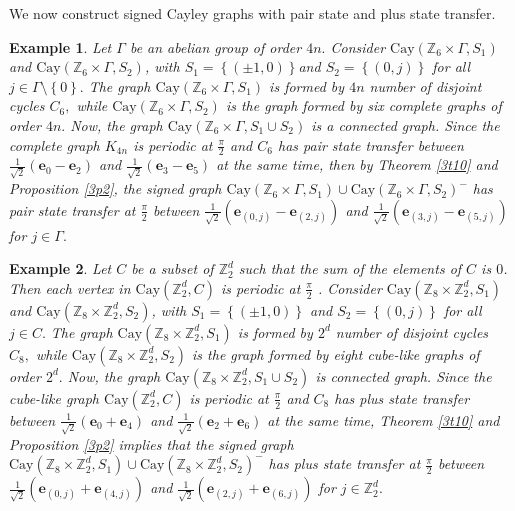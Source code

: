 \documentclass[12pt,a4paper]{article}
\newtheorem{exa}{Example}
\def \e {{\bf e}}
\def \e {{\mathbf e}}
\newcommand{\ob}[1]{\left(#1\right)}
\newcommand{\cb}[1]{\left\lbrace #1\right\rbrace}
\begin{document}
We now construct signed Cayley graphs with pair state and plus state transfer. 

\begin{exa}
Let $\Gamma$ be an abelian group of order $4n.$ Consider $\text{Cay}\ob{\mathbb{Z}_6\times \Gamma, S_1}$ and $\text{Cay}\ob{\mathbb{Z}_6\times \Gamma, S_2}$, with $S_1=\cb{(\pm 1,0)}$and $S_2=\cb{(0,j)}$ for all $j\in \Gamma \setminus \cb{0}.$ The graph $\text{Cay}\ob{\mathbb{Z}_6\times \Gamma, S_1}$ is formed by $4n$ number of disjoint cycles $C_6,$ while $\text{Cay}\ob{\mathbb{Z}_6\times \Gamma, S_2}$ is the graph formed by six complete graphs of order $4n.$ Now, the graph $\text{Cay}\ob{\mathbb{Z}_6\times \Gamma, S_1\cup S_2}$ is a connected graph. Since the complete graph $K_{4n}$ is periodic at $\frac{\pi}{2}$ and $C_6$ has pair state transfer between $\frac{1}{\sqrt2}(\e_0-\e_2)$ and $\frac{1}{\sqrt2}(\e_3-\e_5)$ at the same time, then by Theorem \ref{3t10} and Proposition \ref{3p2}, the signed graph $\text{Cay}\ob{\mathbb{Z}_6\times \Gamma, S_1}\cup \text{Cay}\ob{\mathbb{Z}_6\times \Gamma, S_2}^-$ has pair state transfer at $\frac{\pi}{2}$ between $\frac{1}{\sqrt2}(\e_{(0,j)}-\e_{(2,j)})$ and $\frac{1}{\sqrt2}(\e_{(3,j)}-\e_{(5,j)})$ for $j\in\Gamma.$
\end{exa}

\begin{exa}
Let $C$ be a subset of $\mathbb{Z}_2^d$ such that the sum of the elements of $C$ is $0$. Then each vertex in $\text{Cay}\ob{\mathbb{Z}_2^d, C}$ is periodic at $\frac{\pi}{2}$ \cite{che}. Consider $\text{Cay}\ob{\mathbb{Z}_8\times \mathbb{Z}_2^d , S_1}$ and $\text{Cay}\ob{\mathbb{Z}_8\times \mathbb{Z}_2^d, S_2}$, with $S_1=\cb{(\pm 1,0)}$ and $S_2=\cb{(0,j)}$ for all $j\in C.$ The graph $\text{Cay}\ob{\mathbb{Z}_8\times \mathbb{Z}_2^d , S_1}$ is formed by $2^d$ number of disjoint cycles $C_8,$ while $\text{Cay}\ob{\mathbb{Z}_8\times \mathbb{Z}_2^d, S_2}$ is the graph formed by eight cube-like graphs of order $2^d.$ Now, the graph $\text{Cay}\ob{\mathbb{Z}_8\times \mathbb{Z}_2^d, S_1\cup S_2}$ is connected graph. Since the cube-like graph $\text{Cay}\ob{\mathbb{Z}_2^d, C}$ is periodic at $\frac{\pi}{2}$ and $C_8$ has plus state transfer between $\frac{1}{\sqrt2}(\e_0+\e_4)$ and $\frac{1}{\sqrt2}(\e_2+\e_6)$ at the same time, Theorem \ref{3t10} and Proposition \ref{3p2} implies that the signed graph $\text{Cay}\ob{\mathbb{Z}_8\times \mathbb{Z}_2^d, S_1}\cup \text{Cay}\ob{\mathbb{Z}_8\times \mathbb{Z}_2^d, S_2}^-$ has plus state transfer at $\frac{\pi}{2}$ between $\frac{1}{\sqrt2}(\e_{(0,j)}+\e_{(4,j)})$ and $\frac{1}{\sqrt2}(\e_{(2,j)}+\e_{(6,j)})$ for $j\in\mathbb{Z}_2^d.$
\end{exa}
\end{document}
